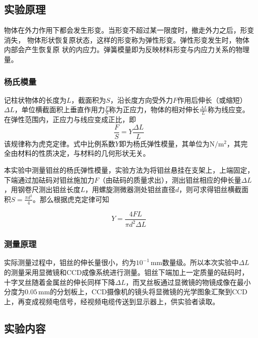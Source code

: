 \documentclass[zihao=5, UTF8]{article}
\theoremstyle{MyLineTheoremStyle} %
\theoremstyle{MyBlockTheoremStyle} %
\theoremstyle{MySubsubsectionStyle} %
\begin{document}
\subsection{实验原理}
物体在外力作用下都会发生形变。当形变不超过某一限度时，撤走外力之后，形变消失，
物体形状恢复原状态，这样的形变称为弹性形变。弹性形变发生时，物体内部会产生恢复原
状的内应力。弹簧模量即为反映材料形变与内应力关系的物理量。

\subsubsection{杨氏模量}

记柱状物体的长度为$ L $，截面积为$ S $，沿长度方向受外力$ F $作用后伸长（或缩短）$ \Delta L $，单位横截面积上垂直作用力$ \frac FS $称为正应力，物体的相对伸长$ \frac{\Delta L}{L} $称为线应变。在弹性范围内，正应力与线应变成正比，即
\begin{equation}
    \frac FS=Y\frac{\Delta L}{L}
\end{equation}
该规律称为虎克定律。式中比例系数$ Y $即为杨氏弹性模量，其单位为$ \mathrm{N/m^2} $，其完全由材料的性质决定，与材料的几何形状无关。

本实验中测量钼丝的杨氏弹性模量，实验方法为将钼丝悬挂在支架上，上端固定，下端通过加砝码对钼丝施加力$ F $（由砝码的质量求出），测出钼丝相应的伸长量$ \Delta L $，用钢卷尺测出钼丝长度$ L $，用螺旋测微器测处钼丝直径$ d $，则可求得钼丝横截面积$ S=\frac{\pi d^2}{4} $。那么根据虎克定律可知

\begin{equation}
    Y=\frac{4FL}{\pi d^2\Delta L}
\end{equation}

\subsubsection{测量原理}

实际测量过程中，钼丝的伸长量很小，约为$ 10^{-1}\,\mathrm{mm} $数量级。所以本次实验中$ \Delta L $的测量采用显微镜和CCD成像系统进行测量。钼丝下端加上一定质量的砝码时，十字叉丝随着金属丝的伸长同样下降$ \Delta L $，而叉丝板通过显微镜的物镜成像在最小分度为$ 0.05\,\mathrm{mm} $的分划板上，CCD摄像机的镜头将显微镜的光学图象汇聚到CCD上，再变成视频电信号，经视频电缆传送到显示器上，供实验者读取。

\subsection{实验内容}
\end{document}
